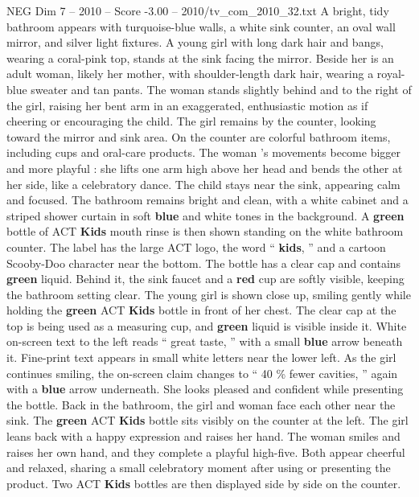 \begin{textsample}{NEG Dim 7 – 2010 – Score -3.00 – 2010/tv\_com\_2010\_32.txt}  \label{ex:f7_neg_046}
A bright, tidy bathroom appears with turquoise-blue walls, a white sink counter, an oval wall mirror, and silver light fixtures.
A young girl with long dark hair and bangs, wearing a coral-pink top, stands at the sink facing the mirror.
Beside her is an adult woman, likely her mother, with shoulder-length dark hair, wearing a royal-blue sweater and tan pants.
The woman stands slightly behind and to the right of the girl, raising her bent arm in an exaggerated, enthusiastic motion as if cheering or encouraging the child.
The girl remains by the counter, looking toward the mirror and sink area.
On the counter are colorful bathroom items, including cups and oral-care products.
The woman ’s movements become bigger and more playful : she lifts one arm high above her head and bends the other at her side, like a celebratory dance.
The child stays near the sink, appearing calm and focused.
The bathroom remains bright and clean, with a white cabinet and a striped shower curtain in soft \textbf{blue} and white tones in the background.
A \textbf{green} bottle of ACT \textbf{Kids} mouth rinse is then shown standing on the white bathroom counter.
The label has the large ACT logo, the word “ \textbf{kids}, ” and a cartoon Scooby-Doo character near the bottom.
The bottle has a clear cap and contains \textbf{green} liquid.
Behind it, the sink faucet and a \textbf{red} cup are softly visible, keeping the bathroom setting clear.
The young girl is shown close up, smiling gently while holding the \textbf{green} ACT \textbf{Kids} bottle in front of her chest.
The clear cap at the top is being used as a measuring cup, and \textbf{green} liquid is visible inside it.
White on-screen text to the left reads “ great taste, ” with a small \textbf{blue} arrow beneath it.
Fine-print text appears in small white letters near the lower left.
As the girl continues smiling, the on-screen claim changes to “ 40 \% fewer cavities, ” again with a \textbf{blue} arrow underneath.
She looks pleased and confident while presenting the bottle.
Back in the bathroom, the girl and woman face each other near the sink.
The \textbf{green} ACT \textbf{Kids} bottle sits visibly on the counter at the left.
The girl leans back with a happy expression and raises her hand.
The woman smiles and raises her own hand, and they complete a playful high-five.
Both appear cheerful and relaxed, sharing a small celebratory moment after using or presenting the product.
Two ACT \textbf{Kids} bottles are then displayed side by side on the counter.

\end{textsample}
